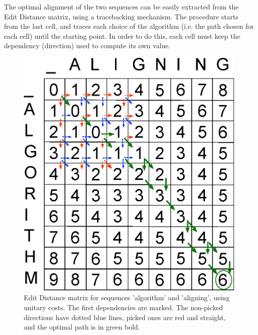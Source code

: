 The optimal alignment of the two sequences can be easily extracted from the Edit Distance matrix, using a tracebacking mechanism. The procedure starts from the last cell, and traces each choice of the algorithm (i.e. the path chosen for each cell) until the starting point. In order to do this, each cell must keep the dependency (direction) used to compute its own value. 


\begin{figure}[htb!]
  \begin{minipage}{0.48\linewidth}
	\centering
	\includegraphics[scale=0.6]{img-align/edit-distance.eps}
	\caption[Edit Distance alignment] {Edit Distance matrix for sequences 'algorithm' and 'aligning', using unitary costs. The first dependencies are marked. The non-picked directions have dotted blue lines, picked ones are red and straight, and the optimal path is in green bold.}
	\label{edit-distance}
  \end{minipage}
  \hspace{0.04\linewidth}
  \begin{minipage}{0.48\linewidth}
	\centering

\end{minipage}
\end{figure}
